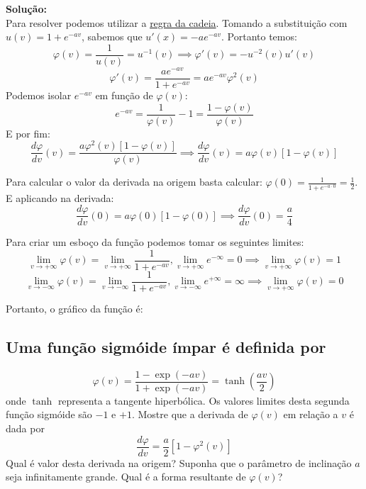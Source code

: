 \documentclass[12pt, openright, a4paper, twoside, english, brazil]{article}
\newenvironment{solution}{\color{red}\noindent\textbf{Solução:}\\}{\color{black}}
\newcommand{\df}[2]{\frac{d#1}{d#2}}
\newcommand{\ghlink}[2]{\href{https://github.com/dreisss/study-notes/blob/main/#1}{#2}}
\newcommand{\difflink}[1]{\ghlink{Differentiation/Real/Abstract_pt.pdf}{#1}}
\begin{document}
\begin{solution}

  Para resolver podemos utilizar a \difflink{regra da cadeia}. Tomando
  a substituição com $u(v)=1+e^{-av}$, sabemos que $u'(x)=-ae^{-av}$.
  Portanto temos:
  $$\varphi(v)=\frac{1}{u(v)}=u^{-1}(v)\implies\varphi'(v)=-u^{-2}(v)u'(v)$$
  $$\varphi'(v)=\frac{ae^{-av}}{1+e^{-av}}=ae^{-av}\varphi^2(v)$$
  Podemos isolar $e^{-av}$ em função de $\varphi(v)$:
  $$e^{-av}=\frac{1}{\varphi(v)}-1=\frac{1-\varphi(v)}{\varphi(v)}$$
  E por fim:
  $$
  \df{\varphi}{v}(v)=\frac{a\varphi^2(v)[1-\varphi(v)]}{\varphi(v)}\implies
  \df{\varphi}{v}(v)=a\varphi(v)[1-\varphi(v)]
  $$

  Para calcular o valor da derivada na origem basta calcular:
  $\displaystyle \varphi(0)=\frac{1}{1+e^{-a\cdot0}}=\frac{1}{2}$. E
  aplicando na derivada:
  $$
  \df{\varphi}{v}(0)=a\varphi(0)[1-\varphi(0)]\implies
  \df{\varphi}{v}(0)=\frac{a}{4}
  $$

  Para criar um esboço da função podemos tomar os seguintes limites:
  $$
  \lim_{v\to+\infty}\varphi(v)=\lim_{v\to+\infty}\frac{1}{1+e^{-av}},
  \lim_{v\to+\infty}e^{-\infty}=0\implies \lim_{v\to+\infty}\varphi(v)=1
  $$
  $$
  \lim_{v\to-\infty}\varphi(v)=\lim_{v\to-\infty}\frac{1}{1+e^{-av}},
  \lim_{v\to-\infty}e^{+\infty}=\infty\implies \lim_{v\to+\infty}\varphi(v)=0
  $$

  \newpage

  Portanto, o gráfico da função é:
  \begin{center}
  \end{center}

\end{solution}

\subsection{Uma função sigmóide ímpar é definida por}
$$
\varphi(v)=\frac{1-\exp(-av)}{1+\exp(-av)}=\tanh(\frac{av}{2})
$$
onde $\tanh$ representa a tangente hiperbólica. Os valores limites
desta segunda função sigmóide são $-1$ e $+1$. Mostre que a derivada de
$\varphi(v)$ em relação a $v$ é dada por
$$
\df{\varphi}{v}=\frac a2[1-\varphi^2(v)]
$$
Qual é  valor desta derivada na origem? Suponha que o parâmetro de
inclinação $a$ seja infinitamente grande. Qual é a forma resultante de
$\varphi(v)$?\\
\end{document}
